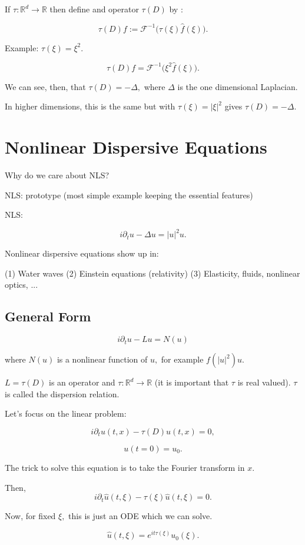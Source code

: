 \documentclass[11pt]{amsart}
\theoremstyle{plain}
\numberwithin{equation}{section}
\theoremstyle{remark}
\newcommand{\R}{\mathbb{R}}
\begin{document}
If $\tau: \R^d \rightarrow \R$ then define and operator $\tau(D)$ by :

$$\tau(D) f := \mathcal{F}^{-1} \big ( \tau(\xi)\hat{f}(\xi) \big ).$$ 

Example: $\tau(\xi) =\xi^2.$

$$\tau(D) f =\mathcal{F}^{-1} \big ( \xi^2 \hat{f}(\xi) \big).$$

We can see, then, that $\tau(D) = -\Delta,$ where $\Delta$ is the one dimensional Laplacian. 

In higher dimensions, this is the same but with $\tau(\xi) = |\xi|^2$ gives $\tau(D)= -\Delta.$

\section{Nonlinear Dispersive Equations}

Why do we care about NLS? 

NLS: prototype (most simple example keeping the essential features)

NLS:

$$i\partial_{t} u -\Delta u = |u|^2 u.$$

Nonlinear dispersive equations show up in:

(1) Water waves
(2) Einstein equations (relativity)
(3) Elasticity, fluids, nonlinear optics, ...


\subsection{General Form}

$$i\partial_{t} u - L u = N(u)$$

where $N(u)$ is a nonlinear function of $u,$ for example $f(|u|^2)u.$

$L=\tau(D)$ is an operator and $\tau :\R^d \rightarrow \R$ (it is important that $\tau$ is real valued).  $\tau$ is called the dispersion relation. 

Let's focus on the linear problem:

$$i\partial_{t} u(t,x) - \tau(D) u(t,x)=0,$$

$$u(t=0) =u_{0}.$$ 

The trick to solve this equation is to take the Fourier transform in $x.$

Then, $$i\partial_{t} \hat{u} (t,\xi) -\tau(\xi) \hat{u}(t,\xi)=0.$$

Now, for fixed $\xi,$ this is just an ODE which we can solve. 

$$\hat{u} (t,\xi)= e^{it \tau(\xi)}\hat{u_{0}}(\xi).$$
\end{document}
